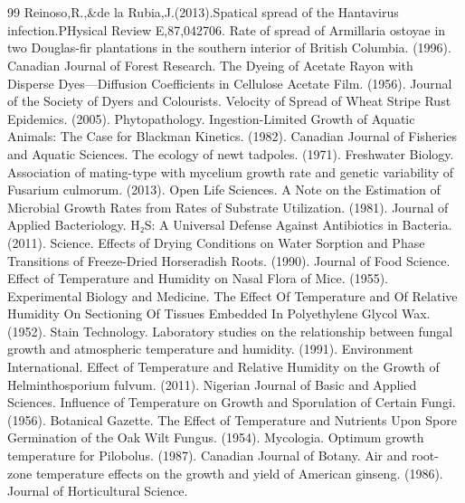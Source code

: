 \documentclass[12pt]{ctexart}
\begin{document}
\section*{}
\begin{thebibliography}{99}
Reinoso,R.,\&de la Rubia,J.(2013).Spatical spread of the Hantavirus infection.PHysical Review E,87,042706.
Rate of spread of Armillaria ostoyae in two Douglas-fir plantations in the southern interior of British Columbia. (1996). Canadian Journal of Forest Research.
The Dyeing of Acetate Rayon with Disperse Dyes—Diffusion Coefficients in Cellulose Acetate Film. (1956). Journal of the Society of Dyers and Colourists.
Velocity of Spread of Wheat Stripe Rust Epidemics. (2005). Phytopathology.
Ingestion-Limited Growth of Aquatic Animals: The Case for Blackman Kinetics. (1982). Canadian Journal of Fisheries and Aquatic Sciences.
The ecology of newt tadpoles. (1971). Freshwater Biology.
Association of mating-type with mycelium growth rate and genetic variability of Fusarium culmorum. (2013). Open Life Sciences.
A Note on the Estimation of Microbial Growth Rates from Rates of Substrate Utilization. (1981). Journal of Applied Bacteriology.
H₂S: A Universal Defense Against Antibiotics in Bacteria. (2011). Science.
Effects of Drying Conditions on Water Sorption and Phase Transitions of Freeze-Dried Horseradish Roots. (1990). Journal of Food Science.
Effect of Temperature and Humidity on Nasal Flora of Mice. (1955). Experimental Biology and Medicine.
The Effect Of Temperature and Of Relative Humidity On Sectioning Of Tissues Embedded In Polyethylene Glycol Wax. (1952). Stain Technology.
Laboratory studies on the relationship between fungal growth and atmospheric temperature and humidity. (1991). Environment International.
Effect of Temperature and Relative Humidity on the Growth of Helminthosporium fulvum. (2011). Nigerian Journal of Basic and Applied Sciences.
Influence of Temperature on Growth and Sporulation of Certain Fungi. (1956). Botanical Gazette.
The Effect of Temperature and Nutrients Upon Spore Germination of the Oak Wilt Fungus. (1954). Mycologia.
Optimum growth temperature for Pilobolus. (1987). Canadian Journal of Botany.
Air and root-zone temperature effects on the growth and yield of American ginseng. (1986). Journal of Horticultural Science.
\end{thebibliography}
\end{document}
